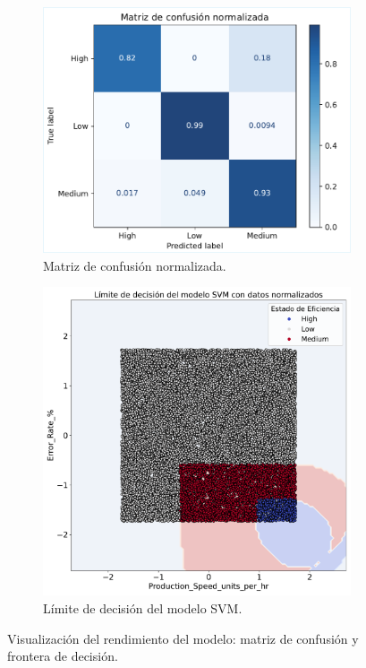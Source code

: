 \begin{figure}[ht!]
    \centering
    \begin{subfigure}[t]{0.53\textwidth}
        \centering
        \includegraphics[width=\textwidth]{fig/08_datadriven/datadriven_05a.pdf}
        \caption{Matriz de confusión normalizada.}
        \label{fig:confusion_matrix}
    \end{subfigure}
    \hfill
    \begin{subfigure}[t]{0.43\textwidth}
        \centering
        \includegraphics[width=\textwidth]{fig/08_datadriven/datadriven_05b.pdf}
        \caption{Límite de decisión del modelo SVM.}
        \label{fig:decision_boundary}
    \end{subfigure}
    \caption{Visualización del rendimiento del modelo: matriz de confusión y frontera de decisión.}
    \label{fig:model_results}
\end{figure}


